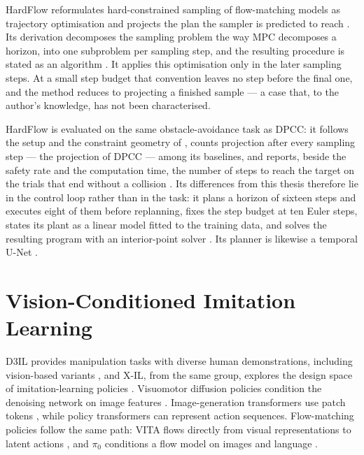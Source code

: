 HardFlow reformulates hard-constrained sampling of flow-matching models as trajectory optimisation and
projects the plan the sampler is predicted to reach \parencite{li2025hardflow}. Its derivation
decomposes the sampling problem the way \ac{MPC} decomposes a horizon, into one subproblem per
sampling step, and the resulting procedure is stated as an algorithm
\parencite[Alg.~1]{li2025hardflow}. It applies this optimisation only in the later sampling steps. At
a small step budget that convention leaves no step before the final one, and the method reduces to
projecting a finished sample --- a case that, to the author's knowledge, has not been characterised.

HardFlow is evaluated on the same obstacle-avoidance task as \ac{DPCC}: it follows the setup and the
constraint geometry of \parencite{romer2025diffusion}, counts projection after every sampling step ---
the projection of \ac{DPCC} --- among its baselines, and reports, beside the safety rate and the
computation time, the number of steps to reach the target on the trials that end without a collision
\parencite[Sec.~VII-A, Table~II]{li2025hardflow}. Its differences from this thesis therefore lie in the
control loop rather than in the task: it plans a horizon of sixteen steps and executes eight of them before replanning,
fixes the step budget at ten Euler steps, states its plant as a linear model fitted to the training
data, and solves the resulting program with an interior-point solver
\parencite[App.~C]{li2025hardflow}. Its planner is likewise a temporal U-Net
\parencite{janner2022planning}.

\section{Vision-Conditioned Imitation Learning}\label{sec:rel:visual}

D3IL provides manipulation tasks with diverse human demonstrations, including vision-based variants
\parencite{jia2024towards}, and X-IL, from the same group, explores the design space of
imitation-learning policies \parencite{jia2025xil}. Visuomotor diffusion policies condition the
denoising network on image features \parencite{chi2023diffusion}. Image-generation transformers use
patch tokens \parencite{peebles2022dit}, while policy transformers can represent action sequences. Flow-matching policies follow the same path: VITA flows
directly from visual representations to latent actions \parencite{gao2025vita}, and $\pi_0$ conditions
a flow model on images and language \parencite{black2024pi0}.

